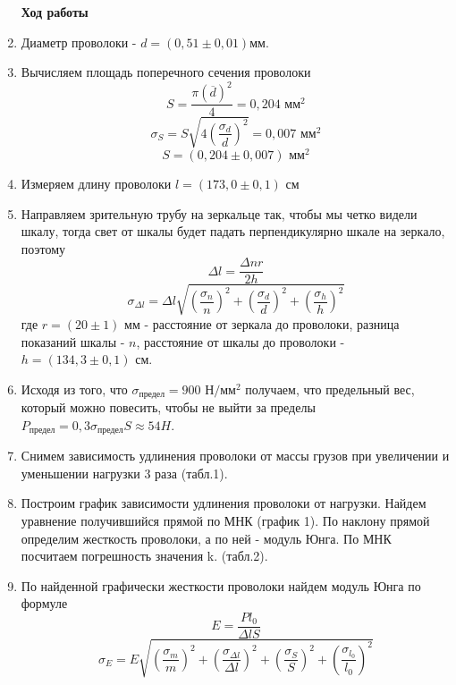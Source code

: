 \documentclass[a4paper, 12pt]{article}%
\begin{document}
	\begin{enumerate}
		\textbf{Ход работы}
		\item Диаметр проволоки - $d = (0,51 \pm 0,01) \text{мм}$.
		\item Вычисляем площадь поперечного сечения проволоки
		\[S =\dfrac{ \pi (\overline{d})^2}{4} = 0,204 \text{ мм}^2\]
		\[\sigma_S = S\sqrt{4\left( \dfrac{\sigma_d}{d}\right) ^2} = 0,007 \text{ мм}^2\]
		\[S = (0,204\pm0,007) \text{ мм}^2\]
		\item Измеряем длину проволоки $l = (173,0 \pm 0,1)\text{ см}$
		\item Направляем зрительную трубу на зеркальце так, чтобы мы четко видели шкалу, тогда свет от шкалы будет падать перпендикулярно шкале на зеркало, поэтому
		\[\Delta l =\dfrac{\Delta nr}{2h}\]
		\[ \sigma_{\Delta l} = \Delta l\sqrt{\left( \dfrac{\sigma_{n}}{n}\right)^2 + \left(\dfrac{\sigma_d}{d}\right)^2+\left(\dfrac{\sigma_h}{h}\right)^2} \]
		где $r = (20\pm 1)$ мм - расстояние от зеркала до проволоки, разница показаний шкалы - $n$, расстояние от шкалы до проволоки - $h = (134,3\pm0,1)\text{ см}$.
		\item Исходя из того, что $\sigma_{\text{предел}} = 900 \text{ Н}/\text{мм}^2$ получаем, что предельный вес, который можно повесить, чтобы не выйти за пределы $P_{\text{предел}} = 0,3 \sigma_{\text{предел}} S \approx 54 H$. 
		\item Снимем зависимость удлинения проволоки от массы грузов при увеличении и уменьшении нагрузки 3 раза (табл.1). 
		\item Построим график зависимости удлинения проволоки от нагрузки. Найдем уравнение получившийся прямой по МНК (график 1). По наклону прямой определим жесткость проволоки, а по ней - модуль Юнга. По МНК посчитаем погрешность значения k. (табл.2).
		
		\item По найденной графически жесткости проволоки найдем модуль Юнга по формуле
		\[E = \dfrac{Pl_0}{\Delta l S}\]
		\[\sigma_E = E\sqrt{\left( \dfrac{\sigma_{m}}{m} \right)^2 +\left( \dfrac{\sigma_{\Delta l}}{\Delta l} \right)^2+ \left( \dfrac{\sigma_{S}}{S} \right)^2 + \left( \dfrac{\sigma_{l_0}}{l_0} \right)^2 }\]
	\end{enumerate}
\end{document}
